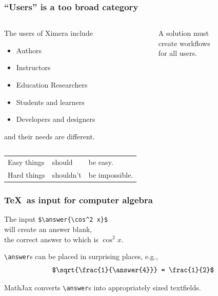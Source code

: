 \documentclass[aspectratio=169,14pt]{beamer}
\begin{document}
\begin{frame}
  \frametitle{``Users'' is a too broad category}

  \begin{columns}
    \begin{column}{0.5\textwidth}
      The users of Ximera include
      \begin{itemize}
      \item Authors
      \item Instructors
      \item Education Researchers
      \item Students and learners
      \item Developers and designers
      \end{itemize}
      and their needs are different.      
    \end{column}
    \begin{column}{0.5\textwidth}
      \huge
      A solution must \\
      create workflows \\
      for all users.
    \end{column}
  \end{columns}



  
\end{frame}

\begin{frame}[nofills]
  \vfill
  \huge

  \begin{tabular}{@{}l@{ }l@{ }l}
  Easy things & should & be easy. \\
  Hard things & shouldn't & be impossible.
  \end{tabular}
  \vfill
\end{frame}

\begin{frame}
  \frametitle{\TeX\ as input for computer algebra}
  \large

  The input \texttt{\$\textbackslash answer\{\textbackslash cos\^{}2 x\}\$} \\
  \quad will create an answer blank, \\
  \quad\quad the correct answer to which is $\cos^2 x$.

  \vfill
  
  \texttt{\textbackslash answer}s can be placed in surprising places, e.g.,
  \[
    \mbox{\texttt{\$\textbackslash sqrt\{\textbackslash frac\{1\}\{\textbackslash answer\{4\}\}\} = \textbackslash frac\{1\}\{2\}\$}}
  \]

  \vfill

  MathJax converts \texttt{\textbackslash answer}s into appropriately
  sized textfields.

  \vfill
  
\end{frame}
\end{document}
